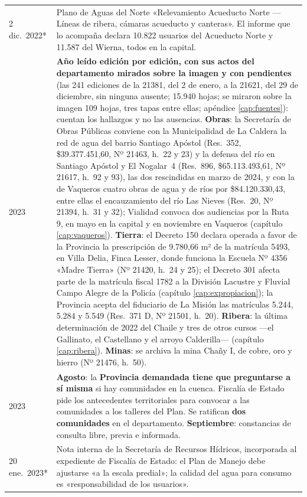 \begin{longtable}{@{}p{2.7cm}p{10.3cm}@{}}
2 dic.\ 2022* & Plano de Aguas del Norte «Relevamiento Acueducto Norte --- Líneas de ribera, cámaras acueducto y canteras». El informe que lo acompaña declara 10.822 usuarios del Acueducto Norte y 11.587 del Wierna, todos en la capital. \\
2023 & \textbf{Año leído edición por edición, con sus actos del departamento mirados sobre la imagen y con pendientes} (las 241 ediciones de la 21381, del 2 de enero, a la 21621, del 29 de diciembre, sin ninguna ausente; 15.940 hojas; se miraron sobre la imagen 109 hojas, tres tapas entre ellas; apéndice \ref{cap:fuentes}): cuentan los hallazgos y no las ausencias. \textbf{Obras}: la Secretaría de Obras Públicas conviene con la Municipalidad de La Caldera la red de agua del barrio Santiago Apóstol (Res.\ 352, \$39.377.451,60, Nº 21463, h.\ 22 y 23) y la defensa del río en Santiago Apóstol y El Nogalar~4 (Res.\ 896, \$65.113.493,61, Nº 21617, h.\ 92 y 93), las dos rescindidas en marzo de 2024, y con la de Vaqueros cuatro obras de agua y de ríos por \$84.120.330,43, entre ellas el encauzamiento del río Las Nieves (Res.\ 20, Nº 21394, h.\ 31 y 32); Vialidad convoca dos audiencias por la Ruta 9, en mayo en la capital y en noviembre en Vaqueros (capítulo \ref{cap:vaqueros}). \textbf{Tierra}: el Decreto 150 declara operada a favor de la Provincia la prescripción de 9.780,66 m² de la matrícula 5493, en Villa Delia, Finca Lesser, donde funciona la Escuela Nº 4356 «Madre Tierra» (Nº 21420, h.\ 24 y 25); el Decreto 301 afecta parte de la matrícula fiscal 1782 a la División Lacustre y Fluvial Campo Alegre de la Policía (capítulo \ref{cap:expropiacion}); la Provincia acepta del fiduciario de La Misión las matrículas 5.244, 5.284 y 5.549 (Res.\ 371 D, Nº 21501, h.\ 20). \textbf{Ribera}: la última determinación de 2022 del Chaile y tres de otros cursos ---el Gallinato, el Castellano y el arroyo Calderilla--- (capítulo \ref{cap:ribera}). \textbf{Minas}: se archiva la mina Chañy I, de cobre, oro y hierro (Nº 21476, h.\ 50). \\
2023 & \textbf{Agosto}: la \textbf{Provincia demandada tiene que preguntarse a sí misma} si hay comunidades en la cuenca. Fiscalía de Estado pide los antecedentes territoriales para convocar a las comunidades a los talleres del Plan. Se ratifican \textbf{dos comunidades} en el departamento. \textbf{Septiembre}: constancias de consulta libre, previa e informada. \\
20 ene.\ 2023* & Nota interna de la Secretaría de Recursos Hídricos, incorporada al expediente de Fiscalía de Estado: el Plan de Manejo debe ajustarse «a la escala predial»; la calidad del agua para consumo es «responsabilidad de los usuarios». \\

\end{longtable}
